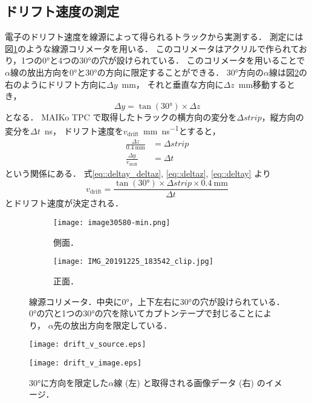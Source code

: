\documentclass[../master]{subfiles}
\begin{document}
\subsection{ドリフト速度の測定}
電子のドリフト速度を線源によって得られるトラックから実測する．
測定には図\ref{pic::alpha_collimator}のような線源コリメータを用いる．
このコリメータはアクリルで作られており，1つの\ang{0}と4つの\ang{30}の穴が設けられている．
このコリメータを用いることで$\alpha$線の放出方向を\ang{0}と\ang{30}の方向に限定することができる．
\ang{30}方向の$\alpha$線は図\ref{fig::drift_v_image}の右のようにドリフト方向に$\Delta y$~\si{\milli\metre}，
それと垂直な方向に$\Delta z$~\si{\milli\metre}移動するとき，
\begin{equation}
  \Delta y = \tan(\ang{30})\times\Delta z \label{eq::deltay_deltaz}
\end{equation}
となる．
MAIKo TPC で取得したトラックの横方向の変分を$\Delta strip$，縦方向の変分を$\Delta t$~\si{\nano\second}，
ドリフト速度を$v_{\text{drift}}$~\si{\milli\metre\per\nano\second}とすると，
\begin{align}
  \frac{\Delta z}{\SI{0.4}{\milli\metre}} & = \Delta strip \label{eq::deltaz}\\
  \frac{\Delta y}{v_{\text{drift}}} & = \Delta t \label{eq::deltay}
\end{align}
という関係にある．
式\eqref{eq::deltay_deltaz}, \eqref{eq::deltaz}, \eqref{eq::deltay} より
\begin{equation}
  v_{\text{drift}} = \frac{\tan(\ang{30})\times\Delta strip\times\SI{0.4}{\milli\metre}}{\Delta t}
\end{equation}
とドリフト速度が決定される．
\begin{figure}
  \centering
  \begin{subfigure}{0.45\columnwidth}
    \centering
    \texttt{[image: image30580-min.png]}
    \caption{側面．}
  \end{subfigure}
  \begin{subfigure}{0.45\columnwidth}
    \centering
    \texttt{[image: IMG\_20191225\_183542\_clip.jpg]}
    \caption{正面．}
  \end{subfigure}
  \caption[線源コリメータ．]
          {線源コリメータ．中央に\ang{0}，上下左右に\ang{30}の穴が設けられている．
            \ang{0}の穴と1つの\ang{30}の穴を除いてカプトンテープで封じることにより，
            $\alpha$先の放出方向を限定している．
          }
          \label{pic::alpha_collimator}
\end{figure}
\begin{figure}
  \centering
  \begin{minipage}{0.45\columnwidth}
    \centering
    \texttt{[image: drift\_v\_source.eps]}
  \end{minipage}
  \begin{minipage}{0.45\columnwidth}
    \centering
    \texttt{[image: drift\_v\_image.eps]}
  \end{minipage}
  \caption[\ang{30}に方向を限定した$\alpha$線と取得される画像データのイメージ．]
          {\ang{30}に方向を限定した$\alpha$線 (左) と取得される画像データ (右) のイメージ．}
  \label{fig::drift_v_image}
\end{figure}
\end{document}
